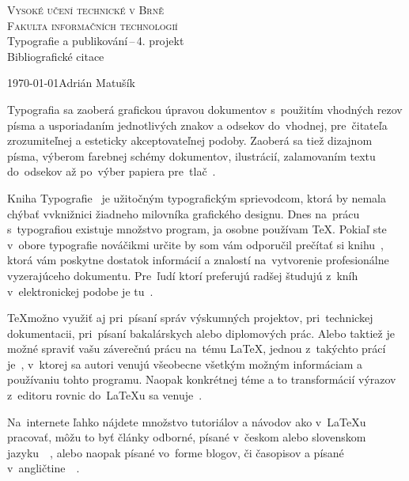\documentclass[a4paper, 11pt]{article}
\begin{document}
    \begin{titlepage}
        \begin{center}
            {\Huge \textsc{Vysoké učení technické v Brně}} \\ \medskip
            {\huge \textsc{Fakulta informačních technologií}} \\ 
            {\LARGE Typografie a publikování\,--\,4. projekt} \\ \medskip
            {\Huge Bibliografické citace}
        \end{center}
        {\Large \today \hfill Adrián Matušík}
    \end{titlepage}
Typografia sa zaoberá grafickou úpravou dokumentov s~použitím vhodných rezov písma a usporiadaním jednotlivých znakov a odsekov do~vhodnej, pre~čitateľa zrozumiteľnej a esteticky akceptovateľnej podoby. Zaoberá sa tiež dizajnom písma, výberom farebnej schémy dokumentov, ilustrácií, zalamovaním textu do~odsekov až po~výber papiera pre~tlač~\cite{wiki1}.

Kniha Typografie~\cite{bookTypography} je užitočným typografickým sprievodcom, ktorá by nemala chýbať vvknižnici žiadneho milovníka grafického designu. Dnes na~prácu s~typografiou existuje množstvo program, ja osobne používam \TeX. Pokiaľ ste v~obore typografie nováčikmi určite by som vám odporučil prečítať si knihu~\cite{bookBeginning}, ktorá vám poskytne dostatok informácií a znalostí na~vytvorenie profesionálne vyzerajúceho dokumentu. Pre~ľudí ktorí preferujú radšej študujú z~kníh v~elektronickej podobe je tu~\cite{onlineNavod}.

\TeX možno využiť aj pri~písaní správ výskumných projektov, pri~technickej dokumentacii, pri~písaní bakalárskych alebo diplomových prác. Alebo taktiež je možné spraviť vašu záverečnú prácu na~tému \LaTeX, jednou z~takýchto prácí je~\cite{zaverecnaPraca1}, v~ktorej sa autori venujú všeobecne všetkým možným informáciam a používaniu tohto programu.
Naopak konkrétnej téme a to transformácií výrazov z~editoru rovnic do~\LaTeX u sa venuje~\cite{zaverecnaPraca2}.

Na~internete ľahko nájdete množstvo tutoriálov a návodov ako v~\LaTeX u pracovať, môžu to byť články odborné, písané v~českom alebo slovenskom jazyku~\cite{onlineNavod2}~\cite{magazine}, alebo naopak písané vo~forme blogov, či časopisov a písané v~angličtine~\cite{journal1}~\cite{journal2}.


\end{document}

